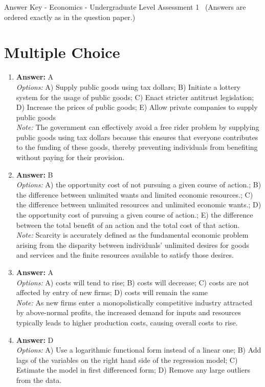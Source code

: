 \documentclass[12pt]{article}
\begin{document}
\begin{center}
Answer Key - Economics - Undergraduate Level Assessment 1 \
\small (Answers are ordered exactly as in the question paper.)
\end{center}

\section*{Multiple Choice}
\begin{enumerate}[label=\arabic*.]
\item \textbf{Answer:} A
\\ \textit{Options:} A) Supply public goods using tax dollars; B) Initiate a lottery system for the usage of public goods; C) Enact stricter antitrust legislation; D) Increase the prices of public goods; E) Allow private companies to supply public goods
\\ \textit{Note:} The government can effectively avoid a free rider problem by supplying public goods using tax dollars because this ensures that everyone contributes to the funding of these goods, thereby preventing individuals from benefiting without paying for their provision.
\item \textbf{Answer:} B
\\ \textit{Options:} A) the opportunity cost of not pursuing a given course of action.; B) the difference between unlimited wants and limited economic resources.; C) the difference between unlimited resources and unlimited economic wants.; D) the opportunity cost of pursuing a given course of action.; E) the difference between the total benefit of an action and the total cost of that action.
\\ \textit{Note:} Scarcity is accurately defined as the fundamental economic problem arising from the disparity between individuals' unlimited desires for goods and services and the finite resources available to satisfy those desires.
\item \textbf{Answer:} A
\\ \textit{Options:} A) costs will tend to rise; B) costs will decrease; C) costs are not affected by entry of new firms; D) costs will remain the same
\\ \textit{Note:} As new firms enter a monopolistically competitive industry attracted by above-normal profits, the increased demand for inputs and resources typically leads to higher production costs, causing overall costs to rise.
\item \textbf{Answer:} D
\\ \textit{Options:} A) Use a logarithmic functional form instead of a linear one; B) Add lags of the variables on the right hand side of the regression model; C) Estimate the model in first differenced form; D) Remove any large outliers from the data.

\end{enumerate}
\end{document}
